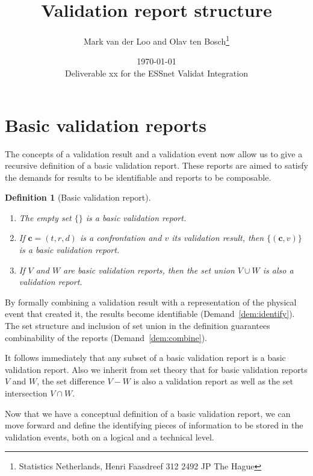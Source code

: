 \documentclass[a4paper, 11pt,titlepage]{article}
\title{Validation report structure}
\author{Mark van der Loo and Olav ten Bosch\thanks{
Statistics Netherlands, Henri Faasdreef 312 2492 JP The Hague
}}
\date{\today\\
\vspace{1cm}
Deliverable xx for the ESSnet Validat Integration
}
\newtheorem{definition}{Definition}
\newcommand{\la}[1]{\boldsymbol{#1}}
\begin{document}
\maketitle{}

\tableofcontents{}

\newpage






 
\section{Basic validation reports}
The concepts of a validation result and a validation event now allow us to give
a recursive definition of a basic validation report. These reports are aimed to
satisfy the demands for results to be identifiable and reports to be
composable.
%
\begin{definition}[Basic validation report]\leavevmode
\begin{enumerate}[topsep=0pt,itemsep=0pt]
\item The empty set $\{\}$ is a basic validation report.
\item If $\la{c}=(t,r,d)$ is a confrontation and $v$ its validation result,
then $\{(\la{c},v)\}$ is a basic validation report.
\item If $V$ and $W$ are basic validation reports, then the set union $V\cup W$
is also a validation report.
\end{enumerate}
\label{def:basicvalidationreport}
\end{definition}
%
By formally combining a validation result with a representation of the physical
event that created it, the results become identifiable
(Demand~\ref{dem:identify}). The set structure and inclusion of set union in
the definition guarantees combinability of the reports
(Demand~\ref{dem:combine}).

It follows immediately that any subset of a basic validation report is a basic
validation report. Also we inherit from set theory that for basic validation
reports $V$ and $W$, the set difference $V-W$ is also a validation report as
well as the set intersection $V\cap W$.

Now that we have a conceptual definition of a basic validation report, we can
move forward and define the identifying pieces of information to be stored in
the validation events, both on a logical and a technical level.
\end{document}

